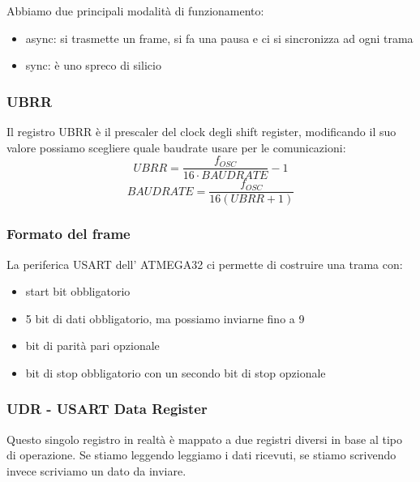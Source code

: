 Abbiamo due principali modalità di funzionamento:
\begin{itemize}
    \item async: si trasmette un frame, si fa una pausa e ci si sincronizza ad ogni trama
    \item sync: è uno spreco di silicio
\end{itemize}

\subsubsection{UBRR}
Il registro UBRR è il prescaler del clock degli shift register, modificando il suo valore possiamo scegliere quale baudrate usare per le comunicazioni:
$$ UBRR = \frac{f_{OSC}}{16 \cdot BAUDRATE} -1 $$
$$ BAUDRATE = \frac{f_{OSC}}{16(UBRR + 1)} $$

\subsubsection{Formato del frame}
La periferica USART dell' ATMEGA32 ci permette di costruire una trama con:
\begin{itemize}
    \item start bit obbligatorio
    \item 5 bit di dati obbligatorio, ma possiamo inviarne fino a 9
    \item bit di parità pari opzionale
    \item bit di stop obbligatorio con un secondo bit di stop opzionale
\end{itemize}

\subsubsection{UDR - USART Data Register}
Questo singolo registro in realtà è mappato a due registri diversi in base al tipo di operazione.
Se stiamo leggendo leggiamo i dati ricevuti, se stiamo scrivendo invece scriviamo un dato da inviare.

